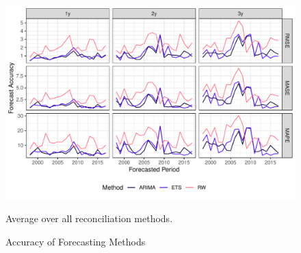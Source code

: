 \documentclass[a4paper,fleqn,11pt]{article}
\begin{document}
\begin{figure}[H]
	\includegraphics[width=\textwidth]{fig/fig_eval_methods}
	\caption{Accuracy of Forecasting Methods}
	\footnotesize{Average over all reconciliation methods.}
\end{figure}
%
\end{document}
